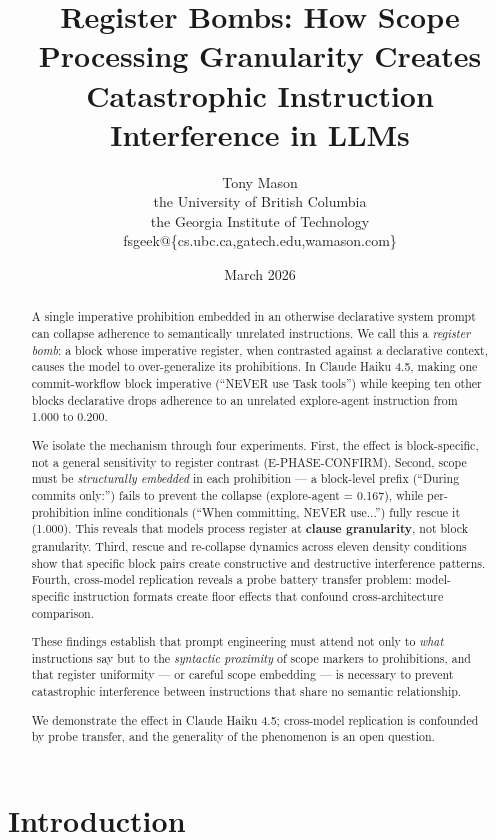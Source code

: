 \documentclass[11pt,a4paper]{article}
\title{\textbf{Register Bombs: How Scope Processing Granularity Creates \\
Catastrophic Instruction Interference in LLMs}}
\author{Tony Mason \\
the University of British Columbia \\
the Georgia Institute of Technology \\
fsgeek@\{cs.ubc.ca,gatech.edu,wamason.com\}}
\date{March 2026}
\begin{document}
\maketitle

\begin{abstract}
A single imperative prohibition embedded in an otherwise declarative
system prompt can collapse adherence to semantically unrelated
instructions. We call this a \emph{register bomb}: a block whose
imperative register, when contrasted against a declarative context,
causes the model to over-generalize its prohibitions. In Claude Haiku
4.5, making one commit-workflow block imperative (``NEVER use Task
tools'') while keeping ten other blocks declarative drops adherence
to an unrelated explore-agent instruction from 1.000 to 0.200.

We isolate the mechanism through four experiments. First, the effect
is block-specific, not a general sensitivity to register contrast
(E-PHASE-CONFIRM). Second, scope must be \emph{structurally embedded}
in each prohibition --- a block-level prefix (``During commits only:'')
fails to prevent the collapse (explore-agent = 0.167), while per-prohibition
inline conditionals (``When committing, NEVER use...'') fully rescue
it (1.000). This reveals that models process register at
\textbf{clause granularity}, not block granularity. Third, rescue and
re-collapse dynamics across eleven density conditions show that
specific block pairs create constructive and destructive interference
patterns. Fourth, cross-model replication reveals a probe battery
transfer problem: model-specific instruction formats create floor
effects that confound cross-architecture comparison.

These findings establish that prompt engineering must attend not only
to \emph{what} instructions say but to the \emph{syntactic proximity}
of scope markers to prohibitions, and that register uniformity ---
or careful scope embedding --- is necessary to prevent catastrophic
interference between instructions that share no semantic relationship.

We demonstrate the effect in Claude Haiku 4.5; cross-model replication
is confounded by probe transfer, and the generality of the phenomenon
is an open question.

\end{abstract}

\section{Introduction}
\end{document}
